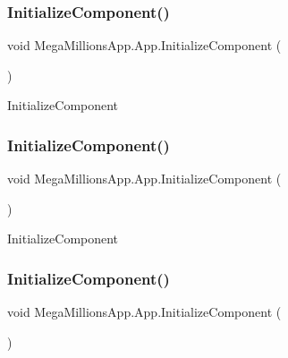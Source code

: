 \subsubsection{\texorpdfstring{Initialize\+Component()}{InitializeComponent()}\hspace{0.1cm}{\footnotesize\ttfamily [1/4]}}
{\footnotesize\ttfamily void Mega\+Millions\+App.\+App.\+Initialize\+Component (\begin{DoxyParamCaption}{ }\end{DoxyParamCaption})}



Initialize\+Component 

\mbox{\label{class_mega_millions_app_1_1_app_ac958e0f1d80a00103e51f8f1cec8dbd2}} 
\subsubsection{\texorpdfstring{Initialize\+Component()}{InitializeComponent()}\hspace{0.1cm}{\footnotesize\ttfamily [2/4]}}
{\footnotesize\ttfamily void Mega\+Millions\+App.\+App.\+Initialize\+Component (\begin{DoxyParamCaption}{ }\end{DoxyParamCaption})}



Initialize\+Component 

\mbox{\label{class_mega_millions_app_1_1_app_ac958e0f1d80a00103e51f8f1cec8dbd2}} 
\subsubsection{\texorpdfstring{Initialize\+Component()}{InitializeComponent()}\hspace{0.1cm}{\footnotesize\ttfamily [3/4]}}
{\footnotesize\ttfamily void Mega\+Millions\+App.\+App.\+Initialize\+Component (\begin{DoxyParamCaption}{ }\end{DoxyParamCaption})}



